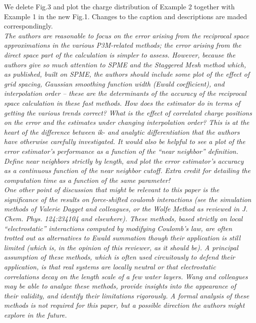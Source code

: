 \documentclass[a4paper]{article}
\begin{document}
We delete Fig.3 and plot the charge distribution of Example 2 together
with Example 1 in the new Fig.1. Changes to the caption and
descriptions are maded correspondingly.\\

\textit{
The authors are reasonable to focus on the error arising from the
reciprocal space approximations in the various P3M-related methods;
the error arising from the direct space part of the calculation is
simpler to assess.  However, because the authors give so much
attention to SPME and the Staggered Mesh method which, as published,
built on SPME, the authors should include some plot of the effect of
grid spacing, Gaussian smoothing function width (Ewald coefficient),
and interpolation order -- these are the determinants of the accuracy of
the reciprocal space calculation in these fast methods.  How does the
estimator do in terms of getting the various trends correct?  What is
the effect of correlated charge positions on the error and the
estimates under changing interpolation order?  This is at the heart of
the difference between ik- and analytic differentiation that the
authors have otherwise carefully investigated.  It would also be
helpful to see a plot of the error estimator’s performance as a
function of the “near neighbor” definition.  Define near neighbors
strictly by length, and plot the error estimator's accuracy as a
continuous function of the near neighbor cutoff.  Extra credit for
detailing the computation time as a function of the same parameter!
}\\

\textit{
One other point of discussion that might be relevant to this paper is
the significance of the results on force-shifted coulomb interactions
(see the simulation methods of Valerie Dagget and colleagues, or the
Wolfe Method as reviewed in J. Chem. Phys. 124:234104 and elsewhere).
These methods, based strictly on local “electrostatic” interactions
computed by modifying Coulomb’s law, are often trotted out as
alternatives to Ewald summation though their application is still
limited (which is, in the opinion of this reviewer, as it should be).
A principal assumption of these methods, which is often used
circuitously to defend their application, is that real systems are
locally neutral or that electrostatic correlations decay on the length
scale of a few water layers.  Wang and colleagues may be able to
analyze these methods, provide insights into the appearance of their
validity, and identify their limitations rigorously.  A formal
analysis of these methods is not required for this paper, but a
possible direction the authors might explore in the future.
}
\end{document}
